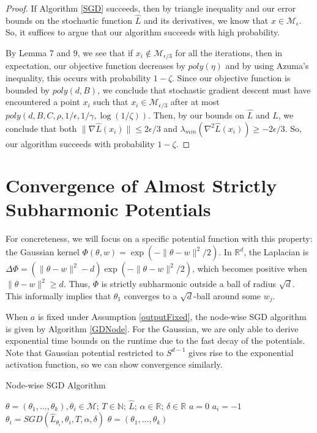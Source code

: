 \documentclass{article}
\newcommand{\N}{{\mathbb{N}}}
\newcommand{\R}{{\mathbb{R}}}
\begin{document}
\begin{proof}
If Algorithm \ref{SGD} succeeds, then by triangle inequality and our error bounds on the stochastic function $\widehat{L}$ and its derivatives, we know that $x \in \mathcal{M}_\epsilon$. So, it suffices to argue that our algorithm succeeds with high probability.

By \cite{GeHJY15} Lemma 7 and 9, we see that if $x_i \not \in\mathcal{M}_{\epsilon/3}$ for all the iterations, then in expectation, our objective function decreases by $poly(\eta)$ and by using Azuma's inequality, this occurs with probability $1-\zeta$. Since our objective function is bounded by $poly(d,B)$, we conclude that stochastic gradient descent must have encountered a point $x_i$ such that $x_i \in \mathcal{M}_{\epsilon/3}$ after at most $poly(d,B,C,\rho,1/\epsilon,1/\gamma, \log(1/\zeta))$. Then, by our bounds on $\widehat{L}$ and $L$, we conclude that both $\|\nabla\widehat{L}(x_i)\| \leq 2\epsilon/3$ and $\lambda_{min}(\nabla^2 \widehat{L}(x_i)) \geq -2\epsilon/3$. So, our algorithm succeeds with probability $1-\zeta$.

\end{proof}



\section{Convergence of Almost Strictly Subharmonic Potentials}\label{App:Subharm}

For concreteness, we will focus on a specific potential function with this property: the Gaussian kernel $\Phi(\theta, w) = \exp(-\|\theta - w\|^2/2)$. In $\R^d$, the Laplacian is $\Delta \Phi = ( \|\theta - w\|^2 -d ) \exp(-\|\theta - w\|^2/2)$, which becomes positive when $\|\theta - w \|^2 \geq d$. Thus, $\Phi$ is strictly subharmonic outside a ball of radius $\sqrt{d}$. This informally implies that $\theta_1$ converges to a $\sqrt{d}$-ball around some $w_j$. 

When $a$ is fixed under Assumption \ref{outputFixed}, the node-wise SGD algorithm is given by Algorithm \ref{GDNode}. For the Gaussian, we are only able to derive exponential time bounds on the runtime due to the fast decay of the potentials. Note that Gaussian potential restricted to $S^{d-1}$ gives rise to the exponential activation function, so we can show convergence similarly.

\begin{algorithm}[hb]
 \caption{Node-wise SGD Algorithm}
   \label{GDNode}
\begin{algorithmic}
    $\theta = (\theta_1,...,\theta_k), \theta_i \in \mathcal{M}$; $T\in \N$; $\widehat{L}$; $\alpha\in \R$; $\delta \in \R$
   \vspace{0.1in}
    $a = 0$
   \STATE $a_i = -1$
   \STATE  $\theta_i =  SGD( \widehat{L}_{\theta_i},\theta_i,T, \alpha,\delta)$
   \ENDFOR
    $\theta = (\theta_1,...,\theta_k)$
\end{algorithmic}
\end{algorithm}
\end{document}
